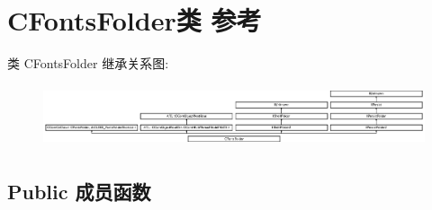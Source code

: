 \hypertarget{class_c_fonts_folder}{}\section{C\+Fonts\+Folder类 参考}
\label{class_c_fonts_folder}
类 C\+Fonts\+Folder 继承关系图\+:\begin{figure}[H]
\begin{center}
\leavevmode
\includegraphics[height=1.851852cm]{class_c_fonts_folder}
\end{center}
\end{figure}
\subsection*{Public 成员函数}
